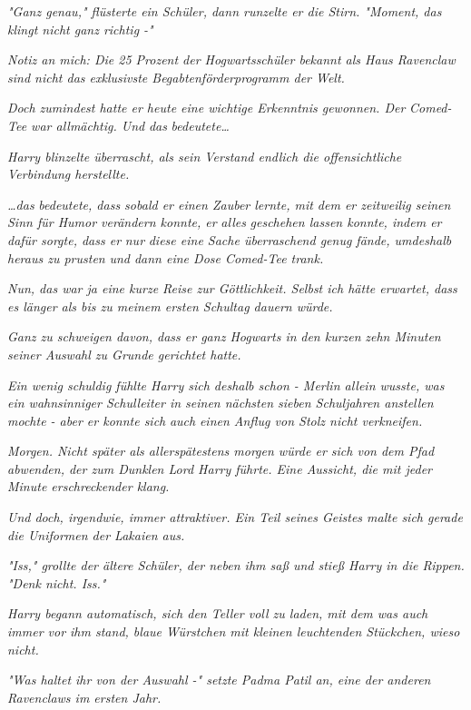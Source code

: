 {\emph{"Ganz genau," flüsterte ein Schüler, dann runzelte er die Stirn. "Moment, das klingt nicht ganz richtig -"}

\emph{\emph{Notiz an mich: Die 25 Prozent der Hogwartsschüler bekannt als Haus Ravenclaw sind nicht das exklusivste Begabtenförderprogramm der Welt.}}

\emph{Doch zumindest hatte er heute eine wichtige Erkenntnis gewonnen. Der} \emph{Comed-Tee war allmächtig. Und} \emph{\emph{das}} \emph{bedeutete…}

\emph{Harry blinzelte überrascht, als sein Verstand endlich die offensichtliche Verbindung herstellte.}

\emph{…\emph{das}} \emph{bedeutete, dass sobald er einen Zauber lernte, mit dem er zeitweilig seinen Sinn für Humor verändern konnte, er} \emph{\emph{alles}} \emph{geschehen lassen konnte, indem er dafür sorgte, dass er} \emph{\emph{nur}} \emph{diese eine Sache überraschend genug fände, umdeshalb} \emph{heraus zu prusten} \emph{und dann eine Dose Comed-Tee trank.}

\emph{\emph{Nun, das war ja eine kurze Reise zur Göttlichkeit. Selbst ich hätte erwartet, dass es länger als bis zu meinem ersten Schultag dauern würde.}}

\emph{Ganz zu schweigen davon, dass er ganz Hogwarts in} \emph{den kurzen} \emph{zehn Minuten seiner Auswahl zu Grunde gerichtet hatte.}

\emph{Ein wenig schuldig fühlte Harry sich deshalb schon - Merlin allein wusste, was ein wahnsinniger Schulleiter in seinen nächsten sieben Schuljahren anstellen mochte - aber er konnte sich} \emph{\emph{auch}} \emph{einen Anflug von Stolz nicht verkneifen.}

\emph{Morgen. Nicht später als allerspätestens morgen würde er sich von dem Pfad abwenden, der zum Dunklen Lord Harry führte. Eine Aussicht, die mit jeder Minute erschreckender klang.}

\emph{Und doch, irgendwie, immer attraktiver. Ein Teil seines Geistes malte sich gerade die Uniformen der Lakaien aus.}

\emph{"Iss," grollte der ältere Schüler, der neben ihm saß und stieß Harry in die Rippen. "Denk nicht. Iss."}

\emph{Harry begann automatisch, sich den Teller voll zu laden, mit dem was auch immer vor ihm stand, blaue Würstchen mit kleinen leuchtenden Stückchen, wieso nicht.}

\emph{"Was haltet ihr von der Auswahl -" setzte Padma Patil an, eine der anderen Ravenclaws im ersten Jahr.}

}
